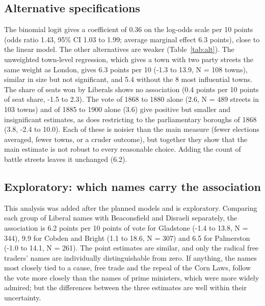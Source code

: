 \documentclass[11pt,a4paper]{article}
\begin{document}
\subsection{Alternative specifications}
The binomial logit gives a coefficient of 0.36 on the log-odds scale per 10 points (odds ratio 1.43, 95\% CI 1.03 to 1.99; average marginal effect 6.3 points), close to the linear model. The other alternatives are weaker (Table~\ref{tab:alt}). The unweighted town-level regression, which gives a town with two party streets the same weight as London, gives 6.3 points per 10 (-1.3 to 13.9, N = 108 towns), similar in size but not significant, and 5.4 without the 8 most influential towns. The share of seats won by Liberals shows no association (0.4 points per 10 points of seat share, -1.5 to 2.3). The vote of 1868 to 1880 alone (2.6, N = 489 streets in 103 towns) and of 1885 to 1900 alone (3.6) give positive but smaller and insignificant estimates, as does restricting to the parliamentary boroughs of 1868 (3.8, -2.4 to 10.0). Each of these is noisier than the main measure (fewer elections averaged, fewer towns, or a cruder outcome), but together they show that the main estimate is not robust to every reasonable choice. Adding the count of battle streets leaves it unchanged (6.2).

\subsection{Exploratory: which names carry the association}
This analysis was added after the planned models and is exploratory. Comparing each group of Liberal names with Beaconsfield and Disraeli separately, the association is 6.2 points per 10 points of vote for Gladstone (-1.4 to 13.8, N = 344), 9.9 for Cobden and Bright (1.1 to 18.6, N = 307) and 6.5 for Palmerston (-1.0 to 14.1, N = 261). The point estimates are similar, and only the radical free traders' names are individually distinguishable from zero. If anything, the names most closely tied to a cause, free trade and the repeal of the Corn Laws, follow the vote more closely than the names of prime ministers, which were more widely admired; but the differences between the three estimates are well within their uncertainty.
\end{document}
